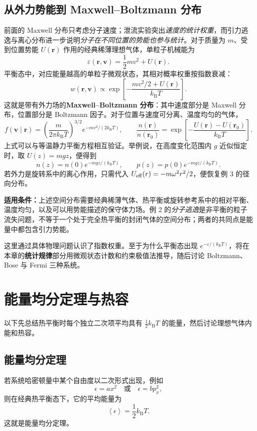 \documentclass[11pt,a4paper,openany]{ctexbook}
\newcommand{\kb}{k_{\mathrm B}}
\newcommand{\avg}[1]{\left\langle #1\right\rangle}
\newcommand{\vv}{\bm{v}}
\newcommand{\vr}{\bm{r}}
\begin{document}
\subsection*{从外力势能到 Maxwell--Boltzmann 分布}
前面的 Maxwell 分布只考虑分子速度；泄流实验突出\emph{速度的统计权重}，而引力逃逸与离心分布进一步说明\emph{分子在不同位置的势能也参与统计}。对于质量为 $m$、受到位置势能 $U(\vr)$ 作用的经典稀薄理想气体，单粒子机械能为
\[
\varepsilon(\vr,\vv)=\frac12mv^2+U(\vr).
\]
平衡态中，对应能量越高的单粒子微观状态，其相对概率权重按指数衰减：
\[
\boxed{w(\vr,\vv)\propto
\exp\!\left[-\frac{mv^2/2+U(\vr)}{\kb T}\right]}.
\]
这就是带有外力场的\textbf{Maxwell--Boltzmann 分布}：其中速度部分是 Maxwell 分布，位置部分是 Boltzmann 因子。对于位置与速度可分离、温度均匀的气体，
\[
f(\vv\mid \vr)=
\left(\frac{m}{2\pi\kb T}\right)^{3/2}
e^{-mv^2/(2\kb T)},\qquad
\boxed{\frac{n(\vr)}{n(\vr_0)}
=\exp\!\left[-\frac{U(\vr)-U(\vr_0)}{\kb T}\right]}.
\]
上式可以与等温静力平衡方程相互验证。举例说，在高度变化范围内 $g$ 近似恒定时，取 $U(z)=mgz$，便得到
\[
\boxed{n(z)=n(0)e^{-mgz/(\kb T)}},\qquad
p(z)=p(0)e^{-mgz/(\kb T)}.
\]
若外力是旋转系中的离心作用，只需代入
$U_{\rm eff}(r)=-m\omega^2r^2/2$，便恢复例 3 的径向分布。

\begin{notebox}
\textbf{适用条件：}上述空间分布需要经典稀薄气体、热平衡或旋转参考系中的相对平衡、温度均匀，以及可以用势能描述的保守体力场。例 2 的\emph{分子逃逸}是非平衡的粒子流失问题，不等于一个处于完全热平衡的封闭气体的空间分布；两者的共同点是能量中都包含引力势能。
\end{notebox}

这里通过具体物理问题认识了指数权重。至于为什么平衡态出现 $e^{-\varepsilon/(\kb T)}$，将在本章的\textbf{统计规律}部分用微观状态计数和约束极值法推导，随后讨论 Boltzmann、Bose 与 Fermi 三种系统。

\section{能量均分定理与热容}
以下先总结热平衡时每个独立二次项平均具有 $\frac12\kb T$ 的能量，然后讨论理想气体内能和热容。

\subsection*{能量均分定理}
若系统哈密顿量中某个自由度以二次形式出现，例如
\[
\epsilon=ax^2\quad \text{或}\quad \epsilon=bp_x^2,
\]
则在经典热平衡态下，它的平均能量为
\[
\boxed{\avg{\epsilon}=\frac12\kb T}.
\]
这就是能量均分定理。
\end{document}
